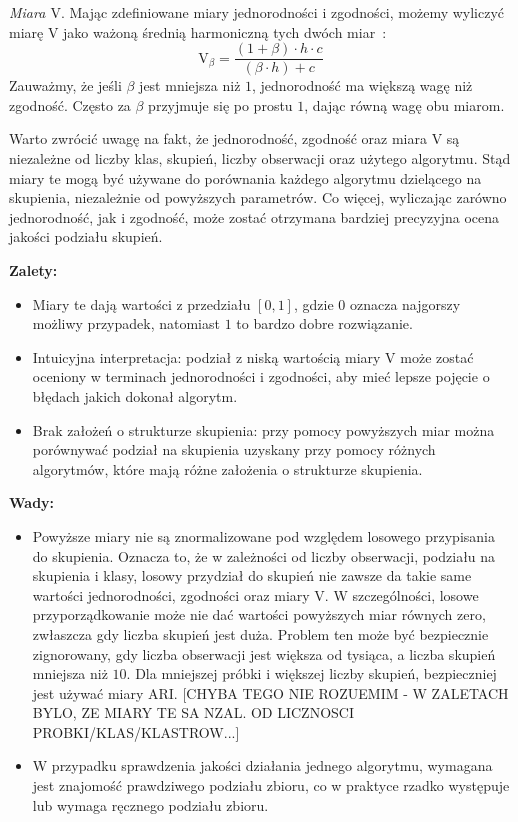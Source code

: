 \documentclass{praca1}
\begin{document}
\emph{Miara $\textrm{V}$}. Mając zdefiniowane miary jednorodności i zgodności, możemy wyliczyć miarę $\textrm{V}$ jako ważoną średnią harmoniczną tych dwóch miar~\cite{Rosenberg2007:vmeasure}:
\begin{equation}
\textrm{V}_{\beta} = \frac{(1+\beta)\cdot h \cdot c}{(\beta \cdot h) + c}
\end{equation}
Zauważmy, że jeśli $\beta$ jest mniejsza niż $1$, jednorodność ma większą wagę niż zgodność. Często za $\beta$ przyjmuje się po prostu $1$, dając równą wagę obu miarom.

Warto zwrócić uwagę na fakt, że jednorodność, zgodność oraz miara V są niezależne od liczby klas, skupień, liczby obserwacji oraz użytego algorytmu. Stąd miary te mogą być używane do porównania każdego algorytmu dzielącego na skupienia, niezależnie od powyższych parametrów. Co więcej, wyliczając zarówno jednorodność, jak i zgodność, może zostać otrzymana bardziej precyzyjna ocena jakości podziału skupień.

\textbf{Zalety:}
\begin{itemize}
\item Miary te dają wartości z przedziału $[0, 1]$, gdzie $0$ oznacza najgorszy możliwy przypadek, natomiast $1$ to bardzo dobre rozwiązanie.
\item Intuicyjna interpretacja: podział z niską wartością miary V może zostać oceniony w terminach jednorodności i zgodności, aby mieć lepsze pojęcie o błędach jakich dokonał algorytm.
\item Brak założeń o strukturze skupienia: przy pomocy powyższych miar można porównywać podział na skupienia uzyskany przy pomocy różnych algorytmów, które mają różne założenia o strukturze skupienia.
\end{itemize}


\textbf{Wady:}
\begin{itemize}
\item Powyższe miary nie są znormalizowane pod względem losowego przypisania do skupienia. Oznacza to, że w zależności od liczby obserwacji, podziału na skupienia i klasy, losowy przydział do skupień nie zawsze da takie same wartości jednorodności, zgodności oraz miary V. W szczególności, losowe przyporządkowanie może nie dać wartości powyższych miar równych zero, zwłaszcza gdy liczba skupień jest duża. Problem ten może być bezpiecznie zignorowany, gdy liczba obserwacji jest większa od tysiąca, a liczba skupień mniejsza niż $10$. Dla mniejszej próbki i większej liczby skupień, bezpieczniej jest używać miary ARI. [CHYBA TEGO NIE ROZUEMIM - W ZALETACH BYLO, ZE MIARY TE SA NZAL. OD LICZNOSCI PROBKI/KLAS/KLASTROW...]
\item W przypadku sprawdzenia jakości działania jednego algorytmu, wymagana jest znajomość prawdziwego podziału zbioru, co w praktyce rzadko występuje lub wymaga ręcznego podziału zbioru.
\end{itemize}
\end{document}
